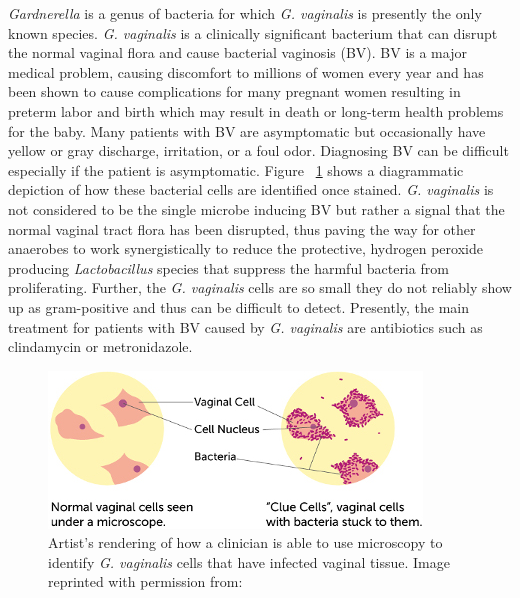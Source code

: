 \indent\indent \textit{Gardnerella} is a genus of bacteria for which \textit{G. vaginalis} is presently the only known species. \textit{G. vaginalis} is a clinically significant bacterium that can disrupt the normal vaginal flora and cause bacterial vaginosis (BV). BV is a major medical problem, causing discomfort to millions of women every year and has been shown to cause complications for many pregnant women resulting in preterm labor and birth which may result in death or long-term health problems for the baby. Many patients with BV are asymptomatic but occasionally have yellow or gray discharge, irritation, or a foul odor. Diagnosing BV can be difficult especially if the patient is asymptomatic. Figure ~\ref{fig:ClueCells} shows a diagrammatic depiction of how these bacterial cells are identified once stained. \textit{G. vaginalis} is not considered to be the single microbe inducing BV but rather a signal that the normal vaginal tract flora has been disrupted, thus paving the way for other anaerobes to work synergistically to reduce the protective, hydrogen peroxide producing {\it Lactobacillus} species that suppress the harmful bacteria from proliferating. Further, the \textit{G. vaginalis} cells are so small they do not reliably show up as gram-positive and thus can be difficult to detect. Presently, the main treatment for patients with BV caused by \textit{G. vaginalis} are antibiotics such as clindamycin or metronidazole.\\
\begin{figure}[h]
\centering
\includegraphics{Figures/ClueCells}
\decoRule
\caption[Clue Cells]{Artist's rendering of how a clinician is able to use microscopy to identify \textit{G. vaginalis} cells that have infected vaginal tissue. Image reprinted with permission from: \citep{_bacterial_????} }
\label{fig:ClueCells}
\end{figure}
